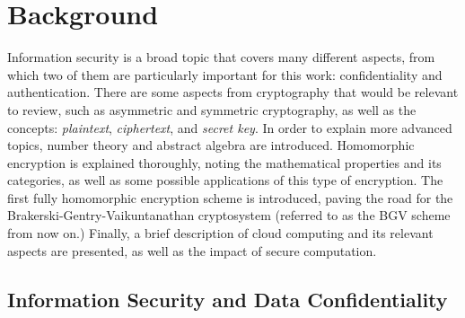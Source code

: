 \chapter{Background}
\label{background}

Information security is a broad topic that covers many different aspects, from which two of them are particularly important for this work: confidentiality and authentication. There are some aspects from cryptography that would be relevant to review, such as asymmetric and symmetric cryptography, as well as the concepts: \emph{plaintext}, \emph{ciphertext}, and \emph{secret key}. In order to explain more advanced topics, number theory and abstract algebra are introduced. Homomorphic encryption is explained thoroughly, noting the mathematical properties and its categories, as well as some possible applications of this type of encryption. The first fully homomorphic encryption scheme is introduced, paving the road for the Brakerski-Gentry-Vaikuntanathan cryptosystem (referred to as the BGV scheme from now on.) Finally, a brief description of cloud computing and its relevant aspects are presented, as well as the impact of secure computation.

\section{Information Security and Data Confidentiality}

